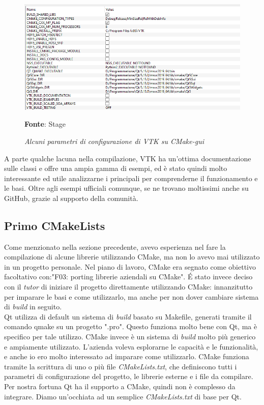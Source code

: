 \begin{figure}[h]
    \centering
    \includegraphics[width=1\textwidth]{immagini/svolgimento/vtkcmake.png}
    \caption{\textit{Alcuni parametri di configurazione di VTK su CMake-gui}}
    \textbf{Fonte}: Stage
    \label{fig: VTK CMAKE}
\end{figure}

A parte qualche lacuna nella compilazione, VTK ha un'ottima documentazione sulle classi e offre una ampia gamma di esempi, ed è stato quindi molto interessante ed utile analizzarne i principali per comprenderne il funzionamento e le basi. Oltre agli esempi ufficiali comunque, se ne trovano moltissimi anche su GitHub, grazie al supporto della comunità.

\subsection{Primo CMakeLists}\label{sec:primo-cmake}
Come menzionato nella sezione precedente, avevo esperienza nel fare la compilazione di alcune librerie utilizzando CMake, ma non lo avevo mai utilizzato in un progetto personale. Nel piano di lavoro, CMake era segnato come obiettivo facoltativo con:"F03: porting librerie aziendali su CMake". \'E stato invece deciso con il \emph{tutor} di iniziare il progetto direttamente utilizzando CMake: innanzitutto per imparare le basi e come utilizzarlo, ma anche per non dover cambiare sistema di \emph{build} in seguito.
\\
Qt utilizza di default un sistema di \emph{build} basato su Makefile, generati tramite il comando qmake su un progetto ".pro". Questo funziona molto bene con Qt, ma è specifico per tale utilizzo. CMake invece è un sistema di \emph{build} molto più generico e ampiamente utilizzato. L'azienda voleva esplorarne le capacità e le funzionalità, e anche io ero molto interessato ad imparare come utilizzarlo. CMake funziona tramite la scrittura di uno o più file \emph{CMakeLists.txt}, che definiscono tutti i parametri di configurazione del progetto, le librerie esterne e i file da compilare. Per nostra fortuna Qt ha il supporto a CMake, quindi non è complesso da integrare. Diamo un'occhiata ad un semplice \emph{CMakeLists.txt} di base per Qt.

